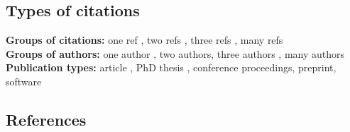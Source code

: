 \documentclass[a4paper]{article}
\begin{document}
\thispagestyle{empty}

\subsection{Types of citations}

\textbf{Groups of citations:} one ref {\cite{karelPhD}}, two refs \cite{karelPhD,simplitigs},
  three refs \cite{karelPhD,gnt,simplitigs}, many refs \\
\textbf{Groups of authors:} one author \cite{karelPhD}, two authors, three
  authors \cite{simplitigs}, many authors \cite{gnt} \\
\textbf{Publication types:} article \cite{gnt}, PhD thesis \cite{karelPhD},
  conference proceedings, preprint, software


\subsection{References}

\printbibliography
\end{document}
